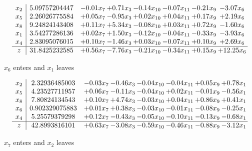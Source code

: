 \documentclass[8pt]{article}
\begin{document}
 \[\begin{array}{c| c c@{\hskip 2pt} c@{\hskip 2pt} c@{\hskip 2pt} c@{\hskip 2pt} c@{\hskip 2pt} c@{\hskip 2pt} }
 x_{2}   &  5.09757204447 & -0.01 x_{7} & +  0.71 x_{3} & -0.14 x_{10} & -0.07 x_{11} & -0.21 x_{9} & -3.07 x_{6}\\
 x_{5}   &  2.26026775584 & +  0.05 x_{7} & -0.95 x_{3} & +  0.02 x_{10} & +  0.04 x_{11} & +  0.17 x_{9} & +  2.19 x_{6}\\
 x_{8}   &  9.24824143408 & +  0.11 x_{7} & +  5.34 x_{3} & -0.08 x_{10} & +  0.03 x_{11} & +  0.72 x_{9} & -1.60 x_{6}\\
 x_{1}   &  3.54277286136 & +  0.02 x_{7} & +  1.50 x_{3} & -0.12 x_{10} & -0.04 x_{11} & -0.33 x_{9} & -3.93 x_{6}\\
 x_{4}   &  2.83095076015 & +  0.10 x_{7} & -1.46 x_{3} & +  0.03 x_{10} & -0.07 x_{11} & +  0.10 x_{9} & +  2.69 x_{6}\\
\hline
z    &  31.8425232585 & +  0.56 x_{7} & -7.76 x_{3} & -0.21 x_{10} & -0.34 x_{11} & +  0.15 x_{9} & + 12.25 x_{6}\\
\end{array}\]


 $ x_{6} $ enters and $ x_{1} $ leaves 

 \[\begin{array}{c| c c@{\hskip 2pt} c@{\hskip 2pt} c@{\hskip 2pt} c@{\hskip 2pt} c@{\hskip 2pt} c@{\hskip 2pt} }
 x_{2}   &  2.32936485003 & -0.03 x_{7} & -0.46 x_{3} & -0.04 x_{10} & -0.04 x_{11} & +  0.05 x_{9} & +  0.78 x_{1}\\
 x_{5}   &  4.23527711957 & +  0.06 x_{7} & -0.11 x_{3} & -0.04 x_{10} & +  0.02 x_{11} & -0.01 x_{9} & -0.56 x_{1}\\
 x_{8}   &  7.80824134543 & +  0.10 x_{7} & +  4.74 x_{3} & -0.03 x_{10} & +  0.04 x_{11} & +  0.86 x_{9} & +  0.41 x_{1}\\
 x_{6}   &  0.902329075883 & +  0.01 x_{7} & +  0.38 x_{3} & -0.03 x_{10} & -0.01 x_{11} & -0.08 x_{9} & -0.25 x_{1}\\
 x_{4}   &  5.25579379298 & +  0.12 x_{7} & -0.43 x_{3} & -0.05 x_{10} & -0.10 x_{11} & -0.13 x_{9} & -0.68 x_{1}\\
\hline
z    &  42.8993816101 & +  0.63 x_{7} & -3.08 x_{3} & -0.59 x_{10} & -0.46 x_{11} & -0.88 x_{9} & -3.12 x_{1}\\
\end{array}\]


 $ x_{7} $ enters and $ x_{2} $ leaves 
\end{document}
